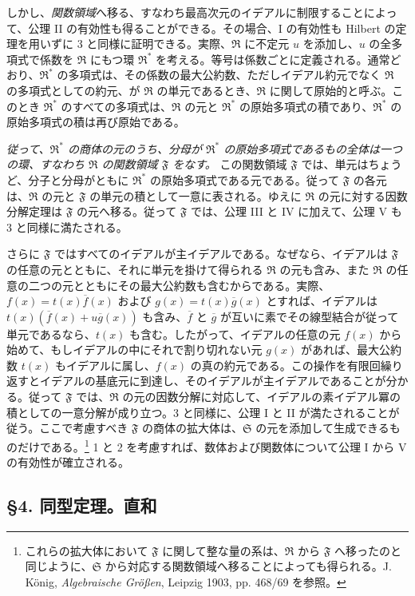\documentclass[11pt]{article}
\providecommand{\mR}{\mathfrak{R}}
\providecommand{\mS}{\mathfrak{S}}
\providecommand{\mF}{\mathfrak{F}}
\begin{document}
しかし、\emph{関数領域}へ移る、すなわち最高次元のイデアルに制限することによって、公理 II の有効性も得ることができる。その場合、I の有効性も Hilbert の定理を用いずに 3 と同様に証明できる。実際、$\mR$ に不定元 $u$ を添加し、$u$ の全多項式で係数を $\mR$ にもつ環 $\mR^*$ を考える。等号は係数ごとに定義される。通常どおり、$\mR^*$ の多項式は、その係数の最大公約数、ただしイデアル約元でなく $\mR$ の多項式としての約元、が $\mR$ の単元であるとき、$\mR$ に関して原始的と呼ぶ。このとき $\mR^*$ のすべての多項式は、$\mR$ の元と $\mR^*$ の原始多項式の積であり、$\mR^*$ の原始多項式の積は再び原始である。

\emph{従って、$\mR^*$ の商体の元のうち、分母が $\mR^*$ の原始多項式であるもの全体は一つの環、すなわち $\mR$ の関数領域 $\mF$ をなす。} この関数領域 $\mF$ では、単元はちょうど、分子と分母がともに $\mR^*$ の原始多項式である元である。従って $\mF$ の各元は、$\mR$ の元と $\mF$ の単元の積として一意に表される。ゆえに $\mR$ の元に対する因数分解定理は $\mF$ の元へ移る。従って $\mF$ では、公理 III と IV に加えて、公理 V も 3 と同様に満たされる。

さらに $\mF$ ではすべてのイデアルが主イデアルである。なぜなら、イデアルは $\mF$ の任意の元とともに、それに単元を掛けて得られる $\mR$ の元も含み、また $\mR$ の任意の二つの元とともにその最大公約数も含むからである。実際、$f(x)=t(x)\overline f(x)$ および $g(x)=t(x)\overline g(x)$ とすれば、イデアルは $t(x)(\overline f(x)+u\overline g(x))$ も含み、$\overline f$ と $\overline g$ が互いに素でその線型結合が従って単元であるなら、$t(x)$ も含む。したがって、イデアルの任意の元 $f(x)$ から始めて、もしイデアルの中にそれで割り切れない元 $g(x)$ があれば、最大公約数 $t(x)$ もイデアルに属し、$f(x)$ の真の約元である。この操作を有限回繰り返すとイデアルの基底元に到達し、そのイデアルが主イデアルであることが分かる。従って $\mF$ では、$\mR$ の元の因数分解に対応して、イデアルの素イデアル冪の積としての一意分解が成り立つ。3 と同様に、公理 I と II が満たされることが従う。ここで考慮すべき $\mF$ の商体の拡大体は、$\mS$ の元を添加して生成できるものだけである。\footnote{これらの拡大体において $\mF$ に関して整な量の系は、$\mR$ から $\mF$ へ移ったのと同じように、$\mS$ から対応する関数領域へ移ることによっても得られる。J. König, \emph{Algebraische Größen}, Leipzig 1903, pp. 468/69 を参照。} 1 と 2 を考慮すれば、数体および関数体について公理 I から V の有効性が確立される。

\subsection*{§4. 同型定理。直和}
\end{document}
